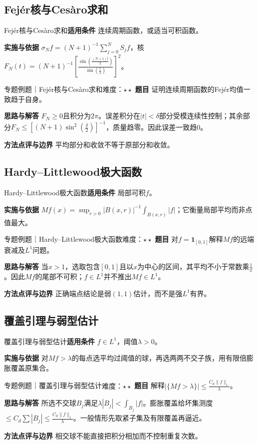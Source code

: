 \subsection{Fejér核与Cesàro求和}\label{mat:fourier_advanced:fejer}
\begin{method}{Fejér核与Cesàro求和}\textbf{适用条件} 连续周期函数，或适当可积函数。\par\textbf{实施与依据} $\sigma_Nf=(N+1)^{-1}\sum_{j=0}^NS_jf$，核$F_N(t)=(N+1)^{-1}[\frac{\sin(\frac{(N+1)t}{2})}{\sin(\frac{t}{2})}]^2$。\end{method}
\begin{example}{专题例题｜Fejér核与Cesàro求和}{难度：$\star\star$}
\textbf{题目} 证明连续周期函数的Fejér均值一致趋于自身。\par\textbf{思路与解答} $F_N\ge0$且积分为$2\pi$。误差积分在$|t|<\delta$部分受模连续性控制；其余部分$F_N\le[(N+1)\sin^2(\frac{\delta}{2})]^{-1}$，质量趋零。因此误差一致趋0。\par\textbf{方法点评与边界} 平均部分和收敛不等于原部分和收敛。
\end{example}
\subsection{Hardy--Littlewood极大函数}\label{mat:fourier_advanced:maximal}
\begin{method}{Hardy--Littlewood极大函数}\textbf{适用条件} 局部可积$f$。\par\textbf{实施与依据} $Mf(x)=\sup_{r>0}|B(x,r)|^{-1}\int_{B(x,r)}|f|$；它衡量局部平均而非点值最大。\end{method}
\begin{example}{专题例题｜Hardy--Littlewood极大函数}{难度：$\star\star$}
\textbf{题目} 对$f=\mathbf1_{[0,1]}$解释$Mf$的远端衰减及$L^1$问题。\par\textbf{思路与解答} 当$x>1$，选取包含$[0,1]$且以$x$为中心的区间，其平均不小于常数乘$\frac{1}{x}$。因此$Mf$的尾部不可积；$f\in L^1$并不推出$Mf\in L^1$。\par\textbf{方法点评与边界} 正确端点结论是弱$(1,1)$估计，而不是强$L^1$有界。
\end{example}
\subsection{覆盖引理与弱型估计}\label{mat:fourier_advanced:weak}
\begin{method}{覆盖引理与弱型估计}\textbf{适用条件} $f\in L^1$，阈值$\lambda>0$。\par\textbf{实施与依据} 对$Mf>\lambda$的每点选平均过阈值的球，再选两两不交子族，用有限倍膨胀覆盖原集合。\end{method}
\begin{example}{专题例题｜覆盖引理与弱型估计}{难度：$\star\star$}
\textbf{题目} 解释$|\{Mf>\lambda\}|\le \frac{C_d\|f\|_1}{\lambda}$。\par\textbf{思路与解答} 所选不交球$B_j$满足$\lambda|B_j|<\int_{B_j}|f|$。膨胀覆盖给坏集测度$\le C_d\sum|B_j|\le \frac{C_d\|f\|_1}{\lambda}$。一般情形先取紧子集及有限覆盖再逼近。\par\textbf{方法点评与边界} 相交球不能直接把积分相加而不控制重复次数。
\end{example}

